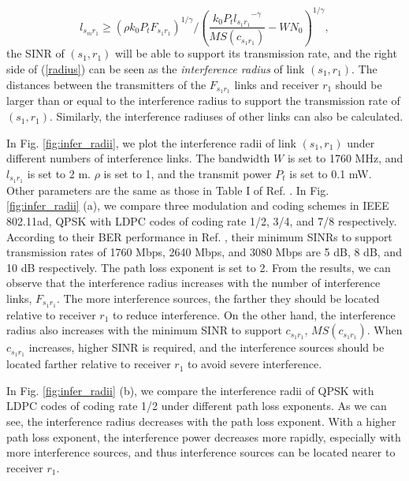 \documentclass[journal]{IEEEtran}
\begin{document}
\begin{equation}
{l_{{s_m}{r_1}}} \ge {(\rho {k_0}{P_t}{F_{{s_1}{r_1}}})^{1/\gamma
}}/{(\frac{{{k_0}{P_t}{l_{{s_1}{r_1}}}^{ - \gamma }}}{{MS({c_{{s_1}{r_1}}})}} - W{N_0})^{1/\gamma
}},\label{radius}
\end{equation}
the SINR of $({s_1},{r_1})$ will be able to support its transmission rate, and the right side of
(\ref{radius}) can be seen as the \emph{interference radius} of link $({s_1},{r_1})$. The distances
between the transmitters of the ${F_{{s_1}{r_1}}}$ links and receiver $r_1$ should be larger than
or equal to the interference radius to support the transmission rate of $({s_1},{r_1})$. Similarly,
the interference radiuses of other links can also be calculated.

In Fig. \ref{fig:infer_radii}, we plot the interference radii of link $({s_1},{r_1})$ under
different numbers of interference links. The bandwidth $W$ is set to 1760 MHz, and $l_{{s_1}{r_1}}$
is set to 2 m. $\rho$ is set to 1, and the transmit power $P_t$ is set to 0.1 mW. Other parameters
are the same as those in Table I of Ref. \cite{Qiao}. In Fig. \ref{fig:infer_radii} (a), we compare
three modulation and coding schemes in IEEE 802.11ad, QPSK with LDPC codes of coding rate 1/2, 3/4,
and 7/8 respectively. According to their BER performance in Ref. \cite{mcs}, their minimum SINRs to
support transmission rates of 1760 Mbps, 2640 Mbps, and 3080 Mbps are 5 dB, 8 dB, and 10 dB
respectively. The path loss exponent is set to 2. From the results, we can observe that the
interference radius increases with the number of interference links, ${F_{{s_1}{r_1}}}$. The more
interference sources, the farther they should be located relative to receiver $r_1$ to reduce
interference. On the other hand, the interference radius also increases with the minimum SINR to
support ${c_{{s_1}{r_1}}}$, $MS({c_{{s_1}{r_1}}})$. When ${c_{{s_1}{r_1}}}$ increases, higher SINR
is required, and the interference sources should be located farther relative to receiver $r_1$ to
avoid severe interference.

In Fig. \ref{fig:infer_radii} (b), we compare the interference radii of QPSK with LDPC codes of
coding rate 1/2 under different path loss exponents. As we can see, the interference radius
decreases with the path loss exponent. With a higher path loss exponent, the interference power
decreases more rapidly, especially with more interference sources, and thus interference sources
can be located nearer to receiver $r_1$.
\end{document}
